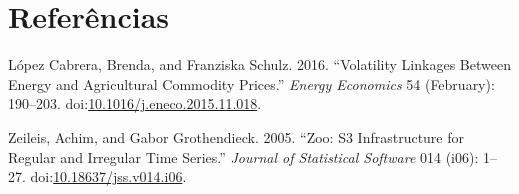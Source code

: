 \documentclass[]{article}
\begin{document}
\pagebreak

\section*{Referências}\label{referencias}

\setlength{\parindent}{0in}

\hypertarget{refs}{}
\hypertarget{ref-lopez_cabrera_volatility_2016}{}
López Cabrera, Brenda, and Franziska Schulz. 2016. ``Volatility Linkages
Between Energy and Agricultural Commodity Prices.'' \emph{Energy
Economics} 54 (February): 190--203.
doi:\href{https://doi.org/10.1016/j.eneco.2015.11.018}{10.1016/j.eneco.2015.11.018}.

\hypertarget{ref-zeileis_zoo:_2005}{}
Zeileis, Achim, and Gabor Grothendieck. 2005. ``Zoo: S3 Infrastructure
for Regular and Irregular Time Series.'' \emph{Journal of Statistical
Software} 014 (i06): 1--27.
doi:\href{https://doi.org/10.18637/jss.v014.i06}{10.18637/jss.v014.i06}.
\end{document}
